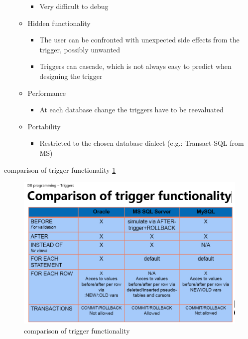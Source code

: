 \documentclass{report}
\begin{document}
\begin{itemize}
\begin{itemize}
\begin{itemize}
                \item Very difficult to debug
            \end{itemize}
            \item Hidden functionality
            \begin{itemize}
                \item The user can be confronted with unexpected side effects from the trigger, possibly unwanted
                \item Triggers can cascade, which is not always easy to predict when designing the trigger
            \end{itemize}
            \item Performance
            \begin{itemize}
                \item At each database change the triggers have to be reevaluated
            \end{itemize}
            \item Portability
            \begin{itemize}
                \item Restricted to the chosen database dialect (e.g.: Transact-SQL from MS)
            \end{itemize}
        \end{itemize}
    \end{itemize}

    comparison of trigger functionality \ref{fig:comparisonTriggerFunc}
    \begin{figure}
        \includegraphics[width=350pt]{./images/comparison of trigger functionality.png}
        \caption{\label{fig:comparisonTriggerFunc}comparison of trigger functionality}
    \end{figure}
\end{document}

